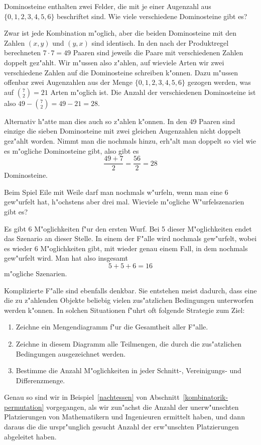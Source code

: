 \begin{beispiele}
\item Dominosteine enthalten zwei Felder, die mit je einer Augenzahl
aus $\{0,1,2,3,4,5,6\}$ beschriftet sind.
Wie viele verschiedene Dominosteine
gibt es?

\begin{loesung}
Zwar ist jede Kombination m"oglich, aber die beiden Dominosteine
mit den Zahlen $(x,y)$ und $(y,x)$ sind identisch.
In den nach der
Produktregel berechneten $7\cdot 7=49$ Paaren sind jeweils die Paare
mit verschiedenen Zahlen doppelt gez"ahlt.
Wir m"ussen also z"ahlen,
auf wieviele Arten wir zwei verschiedene Zahlen auf die Dominosteine
schreiben k"onnen.
Dazu m"ussen offenbar zwei Augenzahlen aus
der Menge $\{0,1,2,3,4,5,6\}$ gezogen werden, was auf 
$\binom{7}{2}=21$ Arten m"oglich ist.
Die Anzahl der verschiedenen
Dominosteine ist also $49 - \binom{7}{2}=49-21=28$.

Alternativ h"atte man dies auch so z"ahlen k"onnen.
In den 49 Paaren sind
einzige die sieben Dominosteine mit zwei gleichen Augenzahlen nicht doppelt
gez"ahlt worden.
Nimmt man die nochmals hinzu, erh"alt man doppelt so viel
wie es m"ogliche Dominosteine gibt, also gibt es
\[
\frac{49+7}{2}=\frac{56}2=28
\]
Dominosteine.
\end{loesung}

\item Beim Spiel Eile mit Weile darf man nochmals w"urfeln, wenn
man eine 6 gew"urfelt hat, h"ochstens aber drei mal.
Wieviele
m"ogliche W"urfelszenarien gibt es?

\begin{loesung}
Es gibt 6 M"oglichkeiten f"ur den ersten Wurf.
Bei 5 dieser M"oglichkeiten endet das Szenario an dieser Stelle.
In einem der
F"alle wird nochmals gew"urfelt, wobei es wieder 6 M"oglichkeiten
gibt, mit wieder genau einem Fall, in dem nochmals gew"urfelt wird.
Man hat also insgesamt 
\[
5 + 5 + 6=16
\]
m"ogliche Szenarien.
\end{loesung}

\end{beispiele}

Komplizierte F"alle sind ebenfalls denkbar.
Sie entstehen meist dadurch, 
dass eine die zu z"ahlenden Objekte beliebig vielen zus"atzlichen
Bedingungen unterworfen werden k"onnen.
In solchen Situationen
f"uhrt oft folgende Strategie zum Ziel:
\begin{enumerate}
\item Zeichne ein Mengendiagramm f"ur die Gesamtheit aller F"alle.
\item Zeichne in diesem Diagramm alle Teilmengen, die durch 
die zus"atzlichen Bedingungen ausgezeichnet werden.
\item Bestimme die Anzahl M"oglichkeiten in jeder Schnitt-, Vereinigungs-
und Differenzmenge.
\end{enumerate}
Genau so sind wir in Beispiel~\ref{nachtessen} von
Abschnitt~\ref{kombinatorik-permutation} vorgegangen,
als wir zun"achst die Anzahl der unerw"unschten Platzierungen
von Mathematikern und Ingenieuren ermittelt haben, und dann daraus
die die urspr"unglich gesucht Anzahl der erw"unschten Platzierungen
abgeleitet haben.

